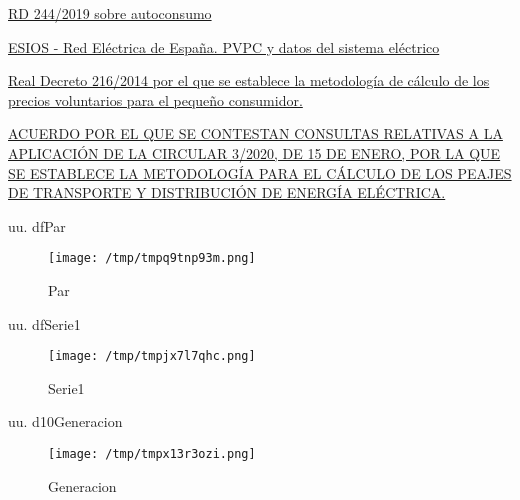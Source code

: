 \documentclass[a4paper,10pt,twocolumn]{article}
\begin{document}
\begin{Form}
\begin{thebibliography}{99}
\href{}{RD 244/2019  sobre autoconsumo}

\href{https://www.esios.ree.es/es/pvpc}{ESIOS - Red Eléctrica de España. PVPC y datos del sistema eléctrico
}


\href{}{Real Decreto 216/2014 por el que se establece la metodología de cálculo de los precios voluntarios para el pequeño consumidor.}


\href{https://www.cnmc.es/sites/default/files/3416756_135.pdf}{ACUERDO POR EL QUE SE CONTESTAN CONSULTAS RELATIVAS A LA
APLICACIÓN DE LA CIRCULAR 3/2020, DE 15 DE ENERO, POR LA QUE SE
ESTABLECE LA METODOLOGÍA PARA EL CÁLCULO DE LOS PEAJES DE
TRANSPORTE Y DISTRIBUCIÓN DE ENERGÍA ELÉCTRICA.}




\end{thebibliography}








\ifdefined\MostrarVariablesAlFinal
\newpage
\onecolumn



uu. dfPar

\begin{figure}[H] \centering
                    
                    \texttt{[image: /tmp/tmpq9tnp93m.png]}
                    \caption{Par}
                    
                    \label{fig:dfassssdfsa}
                    \end{figure}
                    

uu. dfSerie1

\begin{figure}[H] \centering
                    
                    \texttt{[image: /tmp/tmpjx7l7qhc.png]}
                    \caption{Serie1}
                    
                    \label{fig:dfassssdfsa}
                    \end{figure}
                    

uu. d10Generacion

\begin{figure}[H] \centering
                    
                    \texttt{[image: /tmp/tmpx13r3ozi.png]}
                    \caption{Generacion}
                    

\end{figure}
\end{Form}
\end{document}
